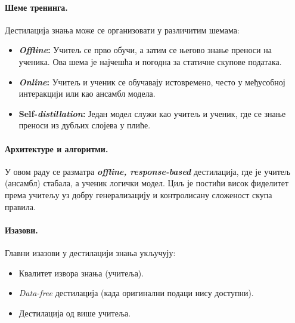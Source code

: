 \paragraph{Шеме тренинга.}
Дестилација знања може се организовати у различитим шемама:
\begin{itemize}
  \item \textbf{\emph{Offline}:} Учитељ се прво обучи, а затим се његово знање преноси на ученика. Ова шема је најчешћа и погодна за статичне скупове података.
  \item \textbf{\emph{Online}:} Учитељ и ученик се обучавају истовремено, често у међусобној интеракцији или као ансамбл модела.
  \item \textbf{Self-\emph{distillation}:} Један модел служи као учитељ и ученик, где се знање преноси из дубљих слојева у плиће.
\end{itemize}

\paragraph{Архитектуре и алгоритми.}
У овом раду се разматра \textbf{\emph{offline, response-based}} дестилација, где је учитељ (ансамбл) стабала, а ученик логички модел. Циљ је постићи висок фиделитет према учитељу уз добру генерализацију и контролисану сложеност скупа правила.

\paragraph{Изазови.}
Главни изазови у дестилацији знања укључују:
\begin{itemize}
  \item Квалитет извора знања (учитеља).
  \item \emph{Data-free} дестилација (када оригинални подаци нису доступни).
  \item Дестилација од више учитеља.
\end{itemize} \cite{gou2021knowledge}